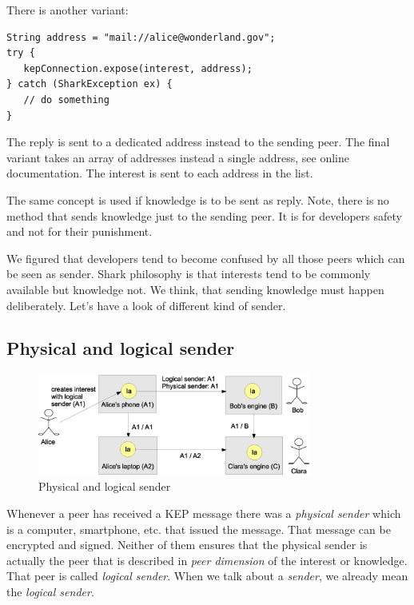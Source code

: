 There is another variant:

\begin{verbatim}
String address = "mail://alice@wonderland.gov";
try {
   kepConnection.expose(interest, address);
} catch (SharkException ex) {
   // do something
}
\end{verbatim}

The reply is sent to a dedicated address instead to the sending peer. The final variant takes an array of addresses instead a single address, see online documentation. The interest is sent to each address in the list.

The same concept is used if knowledge is to be sent as reply. Note, there is no method that sends knowledge just to the sending peer. It is for developers safety and not for their punishment.

We figured that developers tend to become confused by all those peers which can be seen as sender. Shark philosophy is that interests tend to be commonly available but knowledge not. We think, that sending knowledge must happen deliberately. Let's have a look of different kind of sender.

\subsection{Physical and logical sender}
\label{sec:knowledgePorts:sender}

\begin{figure}[t]
\centering
\includegraphics[width=0.80\textwidth]{physicalAndLogicalSender.eps}
\caption{Physical and logical sender}
\label{fig:physicalAndLogicalSender}
\end{figure}

Whenever a peer has received a KEP message there was a {\it physical sender} which is a computer, smartphone, etc. that issued the message. That message can be encrypted and signed. Neither of them ensures that the physical sender is actually the peer that is described in {\it peer dimension} of the interest or knowledge. That peer is called {\it logical sender}. When we talk about a {\it sender}, we already mean the {\it logical sender}.

